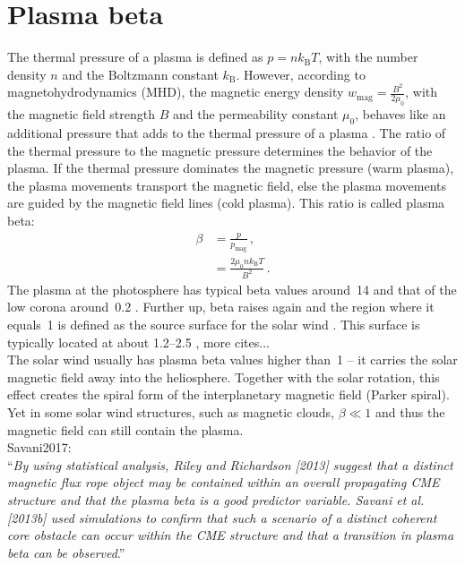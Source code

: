 \section{Plasma beta}
\label{sec:plasma_beta}
The thermal pressure of a plasma is defined as $p = n k_\text{B} T$, with the number density $n$ and the Boltzmann constant $k_\text{B}$. However, according to magnetohydrodynamics (MHD), the magnetic energy density $w_\text{mag} = \frac{B^2}{2 \mu_0}$, with the magnetic field strength $B$ and the permeability constant $\mu_0$, behaves like an additional pressure that adds to the thermal pressure of a plasma \citep[p.~50]{Kivelson1995}. The ratio of the thermal pressure to the magnetic pressure determines the behavior of the plasma. If the thermal pressure dominates the magnetic pressure (warm plasma), the plasma movements transport the magnetic field, else the plasma movements are guided by the magnetic field lines (cold plasma). This ratio is called plasma beta:
\begin{align}
	\beta &= \frac{p}{p_\text{mag}}	\,,\\
	&= \frac{2 \mu_0 n k_\text{B} T}{B^2}	\,.
\end{align}
The plasma at the photosphere has typical beta values around~14 and that of the low corona around~0.2 \citep{Gary2001}. Further up, beta raises again and the region where it equals~1 is defined as the source surface for the solar wind \citep{Schatten1969}.	%
This surface is typically located at about \SIrange{1.2}{2.5}{\Rs} \citep{Gary2001}, more cites...\\

The solar wind usually has plasma beta values higher than~1 -- it carries the solar magnetic field away into the heliosphere. Together with the solar rotation, this effect creates the spiral form of the interplanetary magnetic field (Parker spiral). Yet in some solar wind structures, such as magnetic clouds, $\beta \ll 1$ and thus the magnetic field can still contain the plasma.\\

Savani2017:\\
``\textit{By using statistical analysis, Riley and Richardson [2013] suggest that a distinct magnetic flux rope object may be contained within an overall propagating CME structure and that the plasma beta is a good predictor variable. Savani et al. [2013b] used simulations to confirm that such a scenario of a distinct coherent core obstacle can occur within the CME structure and that a transition in plasma beta can be observed}.''\\


